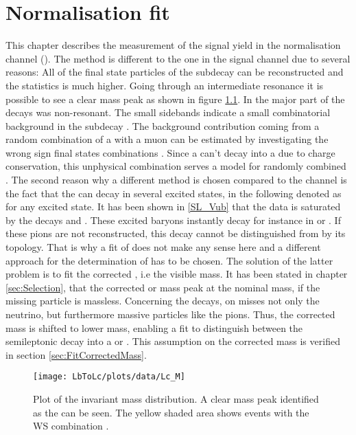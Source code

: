 \chapter{Normalisation fit}
\label{sec:Normalisationfit}
This chapter describes the measurement of the signal yield \NLc in the normalisation channel \LbToLcmunu (\LcTopKpi). 
The method is different to the one in the signal channel \LbToDpmunuX due to several reasons:
All of the final state particles of the subdecay \LcTopKpi can be reconstructed and the statistics is much higher. 
Going through an intermediate resonance it is possible to see a clear \Lc mass peak as shown in figure \ref{fig:plot_Lc_M}.
In \LbToDpmunuX the major part of the decays was non-resonant.
The small sidebands indicate a small combinatorial background in the subdecay \LcTopKpi.
The background contribution coming from a random combination of a \Lc with a muon can be estimated by investigating the wrong sign final states combinations \Lc\mup.
Since a \Lb can't decay into a \Lc\mup due to charge conservation, this unphysical combination serves a model for randomly combined \Lc\mun.
The second reason why a different method is chosen compared to the \LbToDpmunuX channel is the fact that the \Lb can decay in several excited \Lc states, in the following denoted as \Lcstar for any excited \Lc state.
It has been shown in \ref{SL_Vub} that the \LbToLcmunu data is saturated by the decays  and .
These excited \Lcstar baryons instantly decay for instance in \Lc\pip\pim or \Lc\piz. 
If these pions are not reconstructed, this decay cannot be distinguished from \LbToLcmunu by its topology.
That is why a fit of \logIP does not make any sense here and a different approach for the determination of \NLc has to be chosen.
The solution of the latter problem is to fit the corrected \pKpi\mun, i.e the visible \Lb mass.
It has been stated in chapter \ref{sec:Selection}, that the corrected \pKpi\mun or \Lb mass peak at the nominal \Lb mass, if the missing particle is massless.
Concerning the \decay{\Lb}{\Lcstar\mun\neumb} decays, on misses not only the neutrino, but furthermore massive particles like the pions.
Thus, the corrected \Lb mass is shifted to lower mass, enabling a fit to distinguish between the semileptonic \Lb decay into a \Lc or \Lcstar.
This assumption on the corrected mass is verified in section \ref{sec:FitCorrectedMass}.
\begin{figure}[hptb]
    \centering
	\texttt{[image: LbToLc/plots/data/Lc\_M]}	
	\caption{Plot of the invariant \pKpi mass distribution. A clear mass peak identified as the \Lc can be seen. The yellow shaded area shows events with the WS combination \Lc\mup.}
	\label{fig:plot_Lc_M}
\end{figure}

